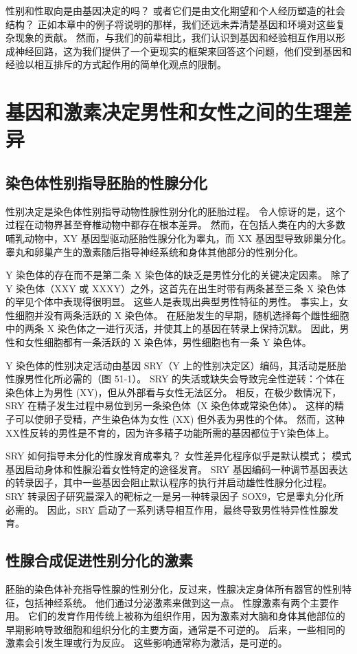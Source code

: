性别和性取向是由基因决定的吗？ 或者它们是由文化期望和个人经历塑造的社会结构？ 正如本章中的例子将说明的那样，我们还远未弄清楚基因和环境对这些复杂现象的贡献。 然而，与我们的前辈相比，我们认识到基因和经验相互作用以形成神经回路，这为我们提供了一个更现实的框架来回答这个问题，他们受到基因和经验以相互排斥的方式起作用的简单化观点的限制。

\section{基因和激素决定男性和女性之间的生理差异}
\subsection{染色体性别指导胚胎的性腺分化}
性别决定是染色体性别指导动物性腺性别分化的胚胎过程。 令人惊讶的是，这个过程在动物界甚至脊椎动物中都存在根本差异。 然而，在包括人类在内的大多数哺乳动物中，XY 基因型驱动胚胎性腺分化为睾丸，而 XX 基因型导致卵巢分化。 睾丸和卵巢产生的激素随后指导神经系统和身体其他部分的性别分化。

Y 染色体的存在而不是第二条 X 染色体的缺乏是男性分化的关键决定因素。 除了 Y 染色体（XXY 或 XXXY）之外，这首先在出生时带有两条甚至三条 X 染色体的罕见个体中表现得很明显。 这些人是表现出典型男性特征的男性。 事实上，女性细胞并没有两条活跃的 X 染色体。 在胚胎发生的早期，随机选择每个雌性细胞中的两条 X 染色体之一进行灭活，并使其上的基因在转录上保持沉默。 因此，男性和女性细胞都有一条活跃的 X 染色体，男性细胞也有一条 Y 染色体。

Y 染色体的性别决定活动由基因 SRY（Y 上的性别决定区）编码，其活动是胚胎性腺男性化所必需的（图 51-1）。 SRY 的失活或缺失会导致完全性逆转：个体在染色体上为男性 (XY)，但从外部看与女性无法区分。 相反，在极少数情况下，SRY 在精子发生过程中易位到另一条染色体（X 染色体或常染色体）。 这样的精子可以使卵子受精，产生染色体为女性 (XX) 但外表为男性的个体。 然而，这种XX性反转的男性是不育的，因为许多精子功能所需的基因都位于Y染色体上。

SRY 如何指导未分化的性腺发育成睾丸？ 女性差异化程序似乎是默认模式； 模式基因启动身体和性腺沿着女性特定的途径发育。 SRY 基因编码一种调节基因表达的转录因子，其中一些基因会阻止默认程序的执行并启动雄性性腺分化过程。 SRY 转录因子研究最深入的靶标之一是另一种转录因子 SOX9，它是睾丸分化所必需的。 因此，SRY 启动了一系列诱导相互作用，最终导致男性特异性性腺发育。

\subsection{性腺合成促进性别分化的激素}
胚胎的染色体补充指导性腺的性别分化，反过来，性腺决定身体所有器官的性别特征，包括神经系统。 他们通过分泌激素来做到这一点。 性腺激素有两个主要作用。 它们的发育作用传统上被称为组织作用，因为激素对大脑和身体其他部位的早期影响导致细胞和组织分化的主要方面，通常是不可逆的。 后来，一些相同的激素会引发生理或行为反应。 这些影响通常称为激活，是可逆的。

